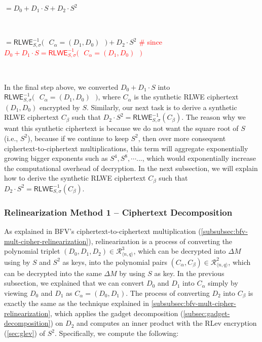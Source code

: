 

$= {D_0 + D_1\cdot S} + D_2\cdot S^2$

$ $

$= \textsf{RLWE}_{S, \sigma}^{-1}\bm{(}\text{ } C_\alpha = (D_1, D_0) \text{ }\bm{)} + D_2\cdot S^2$ \textcolor{red}{ \text{ } \# since $D_0 + D_1\cdot S = \textsf{RLWE}_{S, \sigma}^{-1}\bm{(}\text{ } C_\alpha=(D_1, D_0) \text{ } \bm{)}$ }

$ $

In the final step above, we converted $D_0 + D_1\cdot S$ into $\textsf{RLWE}_{S, \sigma}^{-1}\bm{(}\text{ } C_\alpha=(D_1, D_0) \text{ } \bm{)}$, where $C_\alpha$ is the synthetic RLWE ciphertext $(D_1, D_0)$ encrypted by $S$. Similarly, our next task is to derive a synthetic RLWE ciphertext $C_\beta$ such that $D_2\cdot S^2 = \textsf{RLWE}_{S, \sigma}^{-1}(C_\beta)$. The reason why we want this synthetic ciphertext is because we do not want the square root of $S$ (i.e., $ S^2$), because if we continue to keep $ S^2$, then over more consequent ciphertext-to-ciphertext multiplications, this term will aggregate exponentially growing bigger exponents such as $S^4, S^8, \cdots...$, which would exponentially increase the computational overhead of decryption. In the next subsection, we will explain how to derive the synthetic RLWE ciphertext $C_\beta$ such that $D_2\cdot S^2 = \textsf{RLWE}_{S, \sigma}^{-1}(C_\beta)$.

\subsubsection{Relinearization  Method 1 -- Ciphertext Decomposition}
\label{subsubsec:relinearization-gadget-decomposition}

As explained in BFV's ciphertext-to-ciphertext multiplication (\autoref{subsubsec:bfv-mult-cipher-relinearization}), relinearization is a process of converting the polynomial triplet $(D_0, D_1, D_2) \in \mathcal{R}_{\langle n, q \rangle}^{3}$, which can be decrypted into $\Delta M$ using by $S$ and $S^2$ as keys, into the polynomial pairs $(C_\alpha, C_\beta)\in \mathcal{R}_{\langle n, q \rangle}^{2}$, which can be decrypted into the same $\Delta M$ by using $S$ as key. In the previous subsection, we explained that we can convert $D_0$ and $D_1$ into $C_\alpha$ simply by viewing $D_0$ and $D_1$ as  $C_\alpha = (D_0, D_1)$. The process of converting $D_2$ into $C_\beta$ is exactly the same as the technique explained in \autoref{subsubsec:bfv-mult-cipher-relinearization}, which applies the gadget decomposition (\autoref{subsec:gadget-decomposition}) on $D_2$ and computes an inner product with the RLev encryption (\autoref{sec:glev}) of $S^2$. Specifically, we compute the following:

